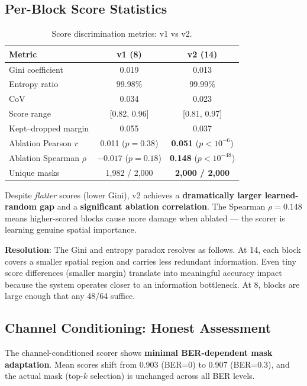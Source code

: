 \documentclass[conference]{IEEEtran}
\begin{document}
\subsection{Per-Block Score Statistics}

\begin{table}[h]
\centering
\caption{Score discrimination metrics: v1 vs v2.}
\begin{tabular}{@{}l c c@{}}
\toprule
\textbf{Metric} & \textbf{v1 (8\texttimes8)} & \textbf{v2 (14\texttimes14)} \\
\midrule
Gini coefficient & 0.019 & 0.013 \\
Entropy ratio & 99.98\% & 99.99\% \\
CoV & 0.034 & 0.023 \\
Score range & [0.82, 0.96] & [0.81, 0.97] \\
Kept--dropped margin & 0.055 & 0.037 \\
\midrule
Ablation Pearson $r$ & 0.011 ($p{=}0.38$) & \textbf{0.051} ($p < 10^{-6}$) \\
Ablation Spearman $\rho$ & $-0.017$ ($p{=}0.18$) & \textbf{0.148} ($p < 10^{-48}$) \\
\midrule
Unique masks & 1,982 / 2,000 & \textbf{2,000 / 2,000} \\
\bottomrule
\end{tabular}
\end{table}

Despite \emph{flatter} scores (lower Gini), v2 achieves a \textbf{dramatically larger learned-random gap} and a \textbf{significant ablation correlation}. The Spearman $\rho{=}0.148$ means higher-scored blocks cause more damage when ablated --- the scorer is learning genuine spatial importance.

\textbf{Resolution}: The Gini and entropy paradox resolves as follows. At 14, each block covers a smaller spatial region and carries less redundant information. Even tiny score differences (smaller margin) translate into meaningful accuracy impact because the system operates closer to an information bottleneck. At 8, blocks are large enough that any 48/64 suffice.


\subsection{Channel Conditioning: Honest Assessment}

The channel-conditioned scorer shows \textbf{minimal BER-dependent mask adaptation}. Mean scores shift from 0.903 (BER=0) to 0.907 (BER=0.3), and the actual mask (top-$k$ selection) is unchanged across all BER levels.
\end{document}
